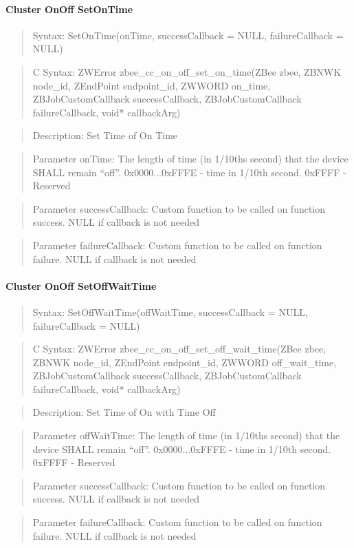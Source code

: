 \paragraph{Cluster OnOff SetOnTime}
\begin{quote}Syntax: SetOnTime(onTime, successCallback = NULL, failureCallback = NULL)\end{quote}
\begin{quote}C Syntax: ZWError zbee\_cc\_on\_off\_set\_on\_time(ZBee zbee, ZBNWK node\_id, ZEndPoint endpoint\_id, ZWWORD on\_time, ZBJobCustomCallback successCallback, ZBJobCustomCallback failureCallback, void* callbackArg)\end{quote}
\begin{quote}Description: Set Time of On Time\end{quote}
\begin{quote}Parameter onTime: The length of time (in 1/10ths second) that the device SHALL remain “off”. 0x0000...0xFFFE - time in 1/10th second. 0xFFFF          - Reserved\end{quote}
\begin{quote}Parameter successCallback: Custom function to be called on function success. NULL if callback is not needed\end{quote}
\begin{quote}Parameter failureCallback: Custom function to be called on function failure. NULL if callback is not needed\end{quote}


\paragraph{Cluster OnOff SetOffWaitTime}
\begin{quote}Syntax: SetOffWaitTime(offWaitTime, successCallback = NULL, failureCallback = NULL)\end{quote}
\begin{quote}C Syntax: ZWError zbee\_cc\_on\_off\_set\_off\_wait\_time(ZBee zbee, ZBNWK node\_id, ZEndPoint endpoint\_id, ZWWORD off\_wait\_time, ZBJobCustomCallback successCallback, ZBJobCustomCallback failureCallback, void* callbackArg)\end{quote}
\begin{quote}Description: Set Time of On with Time Off\end{quote}
\begin{quote}Parameter offWaitTime: The length of time (in 1/10ths second) that the device SHALL remain “off”. 0x0000...0xFFFE - time in 1/10th second. 0xFFFF          - Reserved\end{quote}
\begin{quote}Parameter successCallback: Custom function to be called on function success. NULL if callback is not needed\end{quote}
\begin{quote}Parameter failureCallback: Custom function to be called on function failure. NULL if callback is not needed\end{quote}


